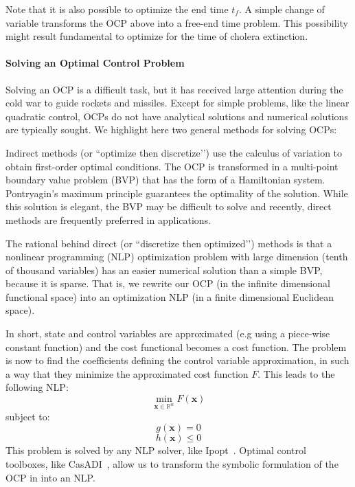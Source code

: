 Note that it is also possible to optimize the end time $t_f$. A simple change of variable transforms the OCP above into a free-end time problem. This possibility might result fundamental to optimize for the time of cholera extinction.

\paragraph{Solving an Optimal Control Problem}
Solving an OCP is a difficult task, but it  has received large attention during the cold war to guide rockets and missiles. Except for simple problems, like the linear quadratic  control, OCPs do not have analytical solutions and numerical solutions are typically sought. We highlight here two general methods for solving OCPs:

\par Indirect methods (or ``optimize then discretize’’) use the calculus of variation to obtain first-order optimal conditions. The OCP is transformed in a multi-point boundary value problem (BVP) that has the form of a Hamiltonian system. Pontryagin’s maximum principle guarantees the optimality of the solution. While this solution is elegant, the BVP may be difficult to solve and recently, direct methods are frequently preferred in applications.

\par The rational behind direct (or ``discretize then optimized’’) methods is that a nonlinear programming (NLP) optimization problem with large dimension (tenth of thousand variables) has an easier numerical solution than a simple BVP, because it is sparse. That is, we rewrite our OCP (in the infinite dimensional functional space) into an optimization NLP (in a finite dimensional Euclidean space). 

In short, state and control variables are approximated (e.g using a piece-wise constant function) and the cost functional becomes a cost function. The problem is now to find the coefficients defining the control variable approximation, in such a way that they minimize the approximated cost function $F$. This leads to the following NLP:
\begin{equation}
\min_{\textbf{x} \in \mathbb{R}^n} F(\textbf{x})
\end{equation}
subject to:
\begin{equation}
g(\textbf{x}) = 0
\end{equation}    
\begin{equation}
h(\textbf{x}) \leq 0
\end{equation}
This problem is solved by any NLP solver, like Ipopt~\cite{wachter_implementation_2006}.   Optimal control toolboxes, like CasADI~\cite{andersson_casadi:_2012}, allow us to transform the symbolic formulation of the OCP in into an NLP. 

